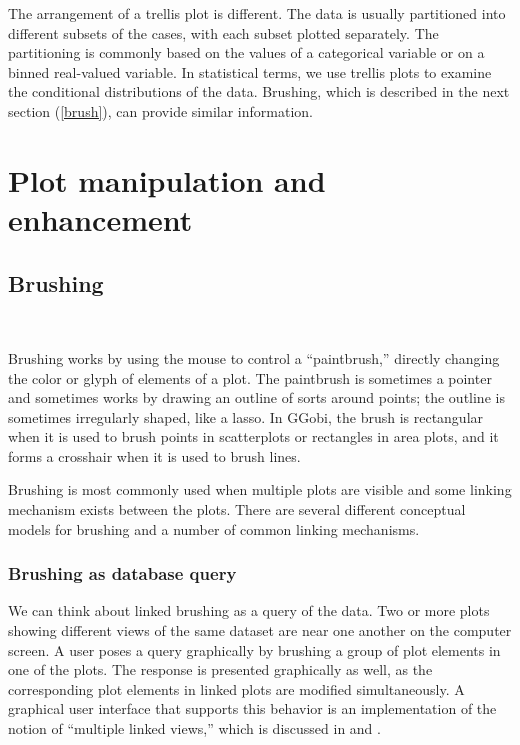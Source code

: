  The arrangement of a trellis plot is different.
The data is usually partitioned into different subsets of the cases,
with each subset plotted separately. The partitioning is commonly
based on the values of a categorical variable or on a binned
real-valued variable. In statistical terms, we use trellis plots to
examine the conditional distributions of the data. Brushing,
 which is described in the next section (\ref{brush}),
can provide similar information.

\section{Plot manipulation and enhancement}

\subsection{Brushing}~\label{brush}

Brushing works by using the mouse to control a ``paintbrush,''
directly changing the color or glyph of elements of a
plot.  The paintbrush  is sometimes
a pointer and sometimes works by drawing an outline of sorts around
points; the outline is sometimes irregularly shaped, like a lasso.  In
GGobi, the brush is rectangular when it is used to brush points in
scatterplots or rectangles in area plots, and it forms a crosshair
when it is used to brush lines.

\newpage
Brushing is most commonly used when multiple plots are visible and
some linking mechanism exists between the plots. There are several
different conceptual models for brushing and a number of common
linking mechanisms. 

\subsubsection{Brushing as database query}

We can think about linked brushing  as a query
of the data.  Two or more plots showing different views of the same
dataset are near one another on the computer screen.  A user poses a
query graphically by brushing a group of plot elements in one of the
plots. The response is presented graphically as well, as the
corresponding plot elements in linked plots are modified
simultaneously.  A graphical user interface that supports this
behavior is an implementation of the notion of ``multiple linked
views,'' which is discussed in  and
.


